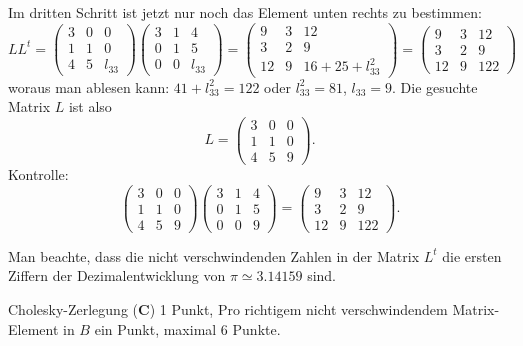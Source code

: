 \begin{loesung}
Im dritten Schritt ist jetzt nur noch das Element unten rechts zu bestimmen:
\[
LL^t=
\begin{pmatrix}
3&0&     0\\
1&1&     0\\
4&5&l_{33}
\end{pmatrix}
\begin{pmatrix}
3&1&     4\\
0&1&     5\\
0&0&l_{33}
\end{pmatrix}
=
\begin{pmatrix}
 9& 3& 12\\
 3& 2&  9\\
12& 9&16+25+l_{33}^2
\end{pmatrix}
=
\begin{pmatrix}
 9& 3& 12\\
 3& 2&  9\\
12& 9&122
\end{pmatrix}
\]
woraus man ablesen kann: $41+l_{33}^2=122$ oder $l_{33}^2=81$, $l_{33}=9$.
Die gesuchte Matrix $L$ ist also
\[
L=
\begin{pmatrix}
3&0&0\\
1&1&0\\
4&5&9
\end{pmatrix}.
\]
Kontrolle:
\[
\begin{pmatrix}
3&0&0\\
1&1&0\\
4&5&9
\end{pmatrix}
\begin{pmatrix}
3&1&4\\
0&1&5\\
0&0&9
\end{pmatrix}
=
\begin{pmatrix}
 9& 3& 12\\
 3& 2&  9\\
12& 9&122
\end{pmatrix}.
\]
\end{loesung}

\begin{diskussion}
Man beachte, dass die nicht verschwindenden Zahlen in der Matrix $L^t$
die ersten Ziffern der Dezimalentwicklung von $\pi\simeq3.14159$ sind.
\end{diskussion}

\begin{bewertung}
Cholesky-Zerlegung ({\bf C}) 1 Punkt,
Pro richtigem nicht verschwindendem Matrix-Element in $B$ ein Punkt,
maximal 6 Punkte.
\end{bewertung}

